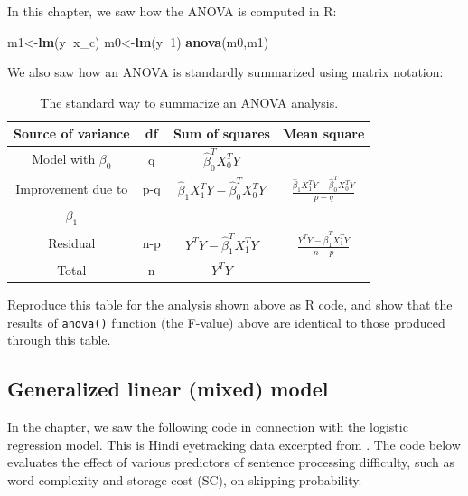 \documentclass[12pt,]{krantz}
\newenvironment{Shaded}{\begin{snugshade}}{\end{snugshade}}
\newcommand{\DecValTok}[1]{\textcolor[rgb]{0.00,0.00,0.81}{#1}}
\newcommand{\KeywordTok}[1]{\textcolor[rgb]{0.13,0.29,0.53}{\textbf{#1}}}
\newcommand{\NormalTok}[1]{#1}
\newcommand{\OperatorTok}[1]{\textcolor[rgb]{0.81,0.36,0.00}{\textbf{#1}}}
\begin{document}
In this chapter, we saw how the ANOVA is computed in R:

\begin{Shaded}
\begin{Highlighting}[]
\NormalTok{m1<-}\KeywordTok{lm}\NormalTok{(y}\OperatorTok{~}\NormalTok{x_c)}
\NormalTok{m0<-}\KeywordTok{lm}\NormalTok{(y}\OperatorTok{~}\DecValTok{1}\NormalTok{)}
\KeywordTok{anova}\NormalTok{(m0,m1)}
\end{Highlighting}
\end{Shaded}

We also saw how an ANOVA is standardly summarized using matrix notation:

\begin{table}[!htbp]
\caption{The standard way to summarize an ANOVA analysis.}
\begin{center}
\begin{tabular}{|c|c|c|c|}
\hline
Source of variance & df & Sum of squares & Mean square\\
\hline
Model with $\beta_0$ & q & $\hat\beta_0^T X_0^T Y$ & \\
Improvement due to & p-q & $\hat \beta_1 X_1^T Y - \hat \beta_0^T X_0^T Y$ & $\frac{\hat \beta_1 X_1^T Y - \hat \beta_0^T X_0^T Y}{p-q}$\\
$\beta_1$ & & & \\
Residual & n-p & $Y^T Y - \hat \beta_1^T X_1^TY$  & $\frac{Y^T Y - \hat \beta_1^T X_1^TY}{n-p}$\\
\hline
Total & n & $Y^T Y$ & \\
\hline
\end{tabular}
\end{center}
\label{tab:anovasummary2}
\end{table}

Reproduce this table for the analysis shown above as R code, and show that the results of \texttt{anova()} function (the F-value) above are identical to those produced through this table.

\hypertarget{sec:GLMM}{%
\subsection{Generalized linear (mixed) model}\label{sec:GLMM}}

In the chapter, we saw the following code in connection with the logistic regression model. This is Hindi eyetracking data excerpted from \citet{HusainVasishthNarayanan2015}. The code below evaluates the effect of various predictors of sentence processing difficulty, such as word complexity and storage cost (SC), on skipping probability.
\end{document}

